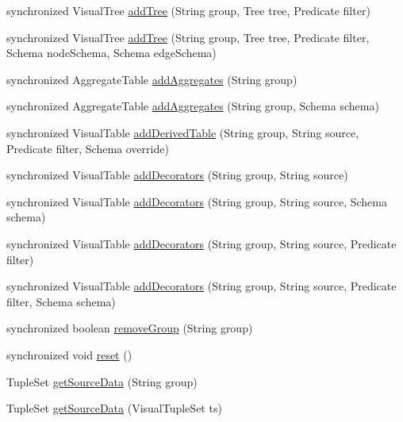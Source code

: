 \begin{DoxyCompactItemize}
\item 
synchronized \-Visual\-Tree \hyperlink{classprefuse_1_1_visualization_af30168807bd7e4bd8081e1f9856b6707}{add\-Tree} (\-String group, \-Tree tree, \-Predicate filter)
\item 
synchronized \-Visual\-Tree \hyperlink{classprefuse_1_1_visualization_abebc28143b6885c4f54a2694fef86b2e}{add\-Tree} (\-String group, \-Tree tree, \-Predicate filter, \-Schema node\-Schema, \-Schema edge\-Schema)
\item 
synchronized \-Aggregate\-Table \hyperlink{classprefuse_1_1_visualization_ac3b5a19eab9b7d7a526240f0098f939b}{add\-Aggregates} (\-String group)
\item 
synchronized \-Aggregate\-Table \hyperlink{classprefuse_1_1_visualization_a5b020fcc6b5ce72e38a0f9d045668746}{add\-Aggregates} (\-String group, \-Schema schema)
\item 
synchronized \-Visual\-Table \hyperlink{classprefuse_1_1_visualization_a243530ab544ea31f7b03519dc4c04510}{add\-Derived\-Table} (\-String group, \-String source, \-Predicate filter, \-Schema override)
\item 
synchronized \-Visual\-Table \hyperlink{classprefuse_1_1_visualization_a147dc277b6158e0722d762023b4c4fe9}{add\-Decorators} (\-String group, \-String source)
\item 
synchronized \-Visual\-Table \hyperlink{classprefuse_1_1_visualization_a64b6e8f1c2332ecb6738b0baffd41c75}{add\-Decorators} (\-String group, \-String source, \-Schema schema)
\item 
synchronized \-Visual\-Table \hyperlink{classprefuse_1_1_visualization_a6dfcfaf77f89086205215c638cd5e084}{add\-Decorators} (\-String group, \-String source, \-Predicate filter)
\item 
synchronized \-Visual\-Table \hyperlink{classprefuse_1_1_visualization_ab294ff49b7d7d2ce993861de926018fc}{add\-Decorators} (\-String group, \-String source, \-Predicate filter, \-Schema schema)
\item 
synchronized boolean \hyperlink{classprefuse_1_1_visualization_a64ef5f9f69c0a9dcd7732f9670d9989f}{remove\-Group} (\-String group)
\item 
synchronized void \hyperlink{classprefuse_1_1_visualization_af0c6319ec0d1b0578649fc0b394b2bcf}{reset} ()
\item 
\-Tuple\-Set \hyperlink{classprefuse_1_1_visualization_a360d8714acdd7ca723a06dbda523c6f4}{get\-Source\-Data} (\-String group)
\item 
\-Tuple\-Set \hyperlink{classprefuse_1_1_visualization_abe501eb83339821b66576178694a5e05}{get\-Source\-Data} (\-Visual\-Tuple\-Set ts)

\end{DoxyCompactItemize}

